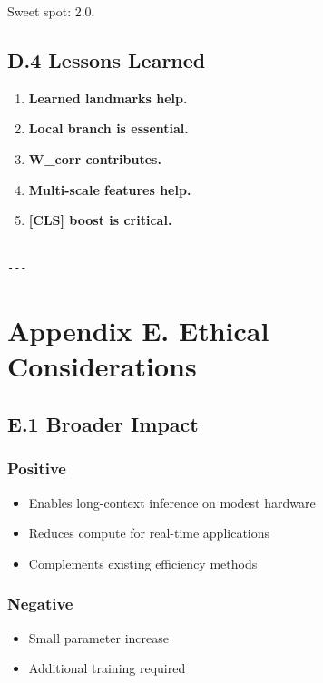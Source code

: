 Sweet spot: 2.0.

\subsection{D.4 Lessons Learned}

\begin{enumerate}
\item \textbf{Learned landmarks help.}
\item \textbf{Local branch is essential.}
\item \textbf{W\_corr contributes.}
\item \textbf{Multi-scale features help.}
\item \textbf{[CLS] boost is critical.}
\end{enumerate}
\begin{lstlisting}

---
\end{lstlisting}

\section{Appendix E. Ethical Considerations}

\subsection{E.1 Broader Impact}

\subsubsection{Positive}
\begin{itemize}
\item Enables long-context inference on modest hardware
\item Reduces compute for real-time applications
\item Complements existing efficiency methods

\end{itemize}
\subsubsection{Negative}
\begin{itemize}
\item Small parameter increase
\item Additional training required

\end{itemize}
